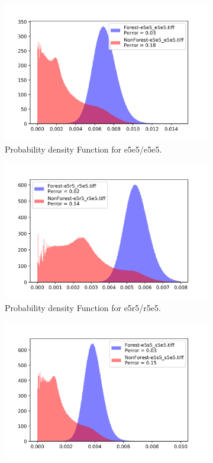 \begin{figure}[H]
  \centering
  \begin{subfigure}[b]{0.4\linewidth}
    \includegraphics[width=\linewidth]{Chapter4/laws_textures/e5e5_e5e5.png}
     \caption{Probability density Function for e5e5/e5e5.}
  \end{subfigure}
  \centering
  \begin{subfigure}[b]{0.4\linewidth}
    \includegraphics[width=\linewidth]{Chapter4/laws_textures/e5r5_r5e5.png}
     \caption{Probability density Function for e5r5/r5e5.}
  \end{subfigure}
  \centering
  \begin{subfigure}[b]{0.4\linewidth}
    \includegraphics[width=\linewidth]{Chapter4/laws_textures/e5s5_s5e5.png}

\end{subfigure}
\end{figure}
